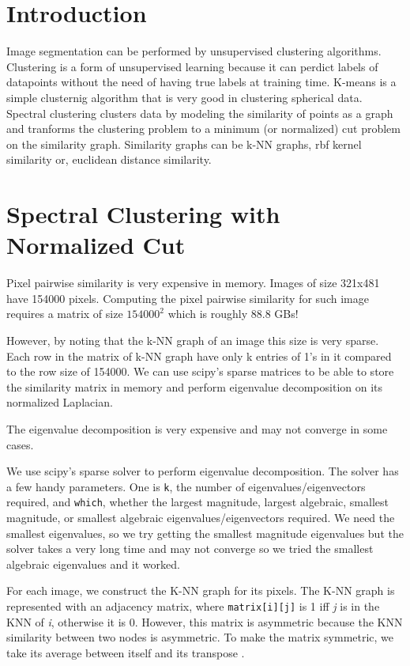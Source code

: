 \documentclass{article}
\begin{document}
	
	\section{Introduction}
	Image segmentation can be performed by unsupervised clustering algorithms. Clustering is a form of unsupervised learning because it can perdict labels of datapoints without the need of having true labels at training time. K-means is a simple clusternig algorithm that is very good in clustering spherical data. Spectral clustering clusters data by modeling the similarity of points as a graph and tranforms the clustering problem to a minimum (or normalized) cut problem on the similarity graph. Similarity graphs can be k-NN graphs, rbf kernel similarity or, euclidean distance similarity.
	
	
	\section{Spectral Clustering with Normalized Cut}
	Pixel pairwise similarity is very expensive in memory. Images of size 321x481 have 154000 pixels. Computing the pixel pairwise similarity for such image requires a matrix of size $154000^2$ which is roughly 88.8 GBs!
	
	However, by noting that the k-NN graph of an image this size is very sparse. Each row in the matrix of k-NN graph have only k entries of 1's in it compared to the row size of 154000. We can use scipy's sparse matrices to be able to store the similarity matrix in memory and perform eigenvalue decomposition on its normalized Laplacian.
	
	The eigenvalue decomposition is very expensive and may not converge in some cases.
	
	We use scipy's sparse solver to perform eigenvalue decomposition. The solver has a few handy parameters. One is \texttt{k}, the number of eigenvalues/eigenvectors required, and \texttt{which}, whether the largest magnitude, largest algebraic, smallest magnitude, or smallest algebraic eigenvalues/eigenvectors required. We need the smallest eigenvalues, so we try getting the smallest magnitude eigenvalues but the solver takes a very long time and may not converge so we tried the smallest algebraic eigenvalues and it worked.
	
	For each image, we construct the K-NN graph for its pixels. The K-NN graph is represented with an adjacency matrix, where \texttt{matrix[i][j]} is 1 iff \textit{j} is in the KNN of \textit{i}, otherwise it is 0. However, this matrix is asymmetric because the KNN similarity between two nodes is asymmetric. To make the matrix symmetric, we take its average between itself and its transpose \cite{sklearnspectral}.
	
\end{document}
